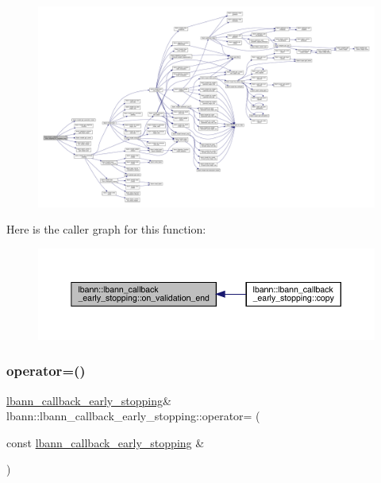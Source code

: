 \begin{figure}[H]
\begin{center}
\leavevmode
\includegraphics[width=350pt]{classlbann_1_1lbann__callback__early__stopping_a32eb9c5e763c97ab1162cfebea7ad049_cgraph}
\end{center}
\end{figure}
Here is the caller graph for this function\+:\nopagebreak
\begin{figure}[H]
\begin{center}
\leavevmode
\includegraphics[width=350pt]{classlbann_1_1lbann__callback__early__stopping_a32eb9c5e763c97ab1162cfebea7ad049_icgraph}
\end{center}
\end{figure}
\mbox{\label{classlbann_1_1lbann__callback__early__stopping_a34c805a2d45651efe3adaa012dc53fa5}} 
\subsubsection{\texorpdfstring{operator=()}{operator=()}}
{\footnotesize\ttfamily \hyperlink{classlbann_1_1lbann__callback__early__stopping}{lbann\+\_\+callback\+\_\+early\+\_\+stopping}\& lbann\+::lbann\+\_\+callback\+\_\+early\+\_\+stopping\+::operator= (\begin{DoxyParamCaption}\item[{const \hyperlink{classlbann_1_1lbann__callback__early__stopping}{lbann\+\_\+callback\+\_\+early\+\_\+stopping} \&}]{ }\end{DoxyParamCaption})\hspace{0.3cm}{\ttfamily [default]}}



